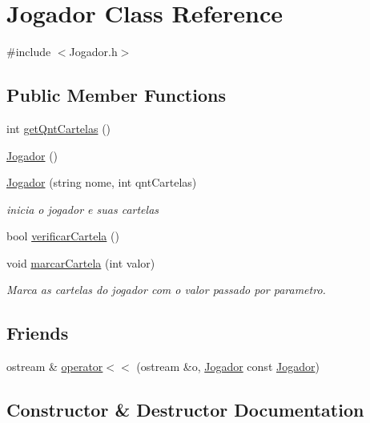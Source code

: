 \hypertarget{classJogador}{}\section{Jogador Class Reference}
\label{classJogador}


{\ttfamily \#include $<$Jogador.\+h$>$}

\subsection*{Public Member Functions}
\begin{DoxyCompactItemize}
\item 
int \hyperlink{classJogador_a58c85bc7bec4ccdb0e59a21a689b48bd}{get\+Qnt\+Cartelas} ()
\item 
\hyperlink{classJogador_a94a4939138ce04d2f3ceb68257517ac1}{Jogador} ()
\item 
\hyperlink{classJogador_a9ea28b90554f801624dbc459cc467c67}{Jogador} (string nome, int qnt\+Cartelas)
\begin{DoxyCompactList}\small\item\em inicia o jogador e suas cartelas \end{DoxyCompactList}\item 
bool \hyperlink{classJogador_a642eab86d4c7b23ba409753f488d9b71}{verificar\+Cartela} ()
\item 
void \hyperlink{classJogador_a05712852ebe27ac61c27652c4e2a7ac3}{marcar\+Cartela} (int valor)
\begin{DoxyCompactList}\small\item\em Marca as cartelas do jogador com o valor passado por parametro. \end{DoxyCompactList}\end{DoxyCompactItemize}
\subsection*{Friends}
\begin{DoxyCompactItemize}
\item 
ostream \& \hyperlink{classJogador_a35b487f3055403dda3edf022e724b7ad}{operator$<$$<$} (ostream \&o, \hyperlink{classJogador}{Jogador} const \hyperlink{classJogador}{Jogador})
\end{DoxyCompactItemize}


\subsection{Constructor \& Destructor Documentation}
